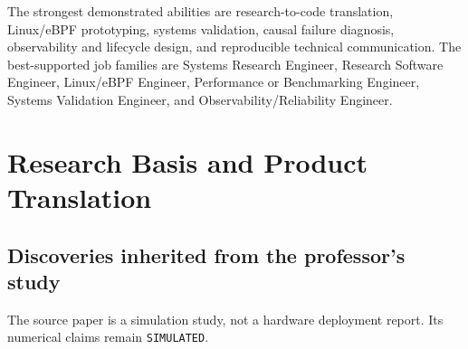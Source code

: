 \documentclass[11pt,a4paper,oneside]{report}
\newcommand{\classify}[1]{\texttt{#1}}
\begin{document}
The strongest demonstrated abilities are research-to-code translation,
Linux/eBPF prototyping, systems validation, causal failure diagnosis,
observability and lifecycle design, and reproducible technical communication.
The best-supported job families are Systems Research Engineer, Research
Software Engineer, Linux/eBPF Engineer, Performance or Benchmarking Engineer,
Systems Validation Engineer, and Observability/Reliability Engineer.

\chapter{Research Basis and Product Translation}

\section{Discoveries inherited from the professor's study}

The source paper is a simulation study, not a hardware deployment report. Its
numerical claims remain \classify{SIMULATED}.
\end{document}

